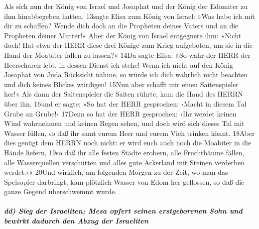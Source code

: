 Als sich nun der König von Israel und Josaphat und der König der
Edomiter zu ihm hinabbegeben hatten, 13sagte Elisa zum König von Israel:
»Was habe ich mit dir zu schaffen? Wende dich doch an die Propheten
deines Vaters und an die Propheten deiner Mutter!« Aber der König von
Israel entgegnete ihm: »Nicht doch! Hat etwa der HERR diese drei Könige
zum Krieg aufgeboten, um sie in die Hand der Moabiter fallen zu lassen?«
14Da sagte Elisa: »So wahr der HERR der Heerscharen lebt, in dessen
Dienst ich stehe! Wenn ich nicht auf den König Josaphat von Juda
Rücksicht nähme, so würde ich dich wahrlich nicht beachten und dich
keines Blickes würdigen! 15Nun aber schafft mir einen Saitenspieler
her!« Als dann der Saitenspieler die Saiten rührte, kam die Hand des
HERRN über ihn, 16und er sagte: »So hat der HERR gesprochen: ›Macht in
diesem Tal Grube an Grube!‹ 17Denn so hat der HERR gesprochen: ›Ihr
werdet keinen Wind wahrnehmen und keinen Regen sehen, und doch wird sich
dieses Tal mit Wasser füllen, so daß ihr samt eurem Heer und eurem Vieh
trinken könnt. 18Aber dies genügt dem HERRN noch nicht: er wird euch
auch noch die Moabiter in die Hände liefern, 19so daß ihr alle festen
Städte erobern, alle Fruchtbäume fällen, alle Wasserquellen verschütten
und alles gute Ackerland mit Steinen verderben werdet.‹« 20Und wirklich,
am folgenden Morgen zu der Zeit, wo man das Speisopfer darbringt, kam
plötzlich Wasser von Edom her geflossen, so daß die ganze Gegend
überschwemmt wurde.

\hypertarget{dd-sieg-der-israeliten-mesa-opfert-seinen-erstgeborenen-sohn-und-bewirkt-dadurch-den-abzug-der-israeliten}{%
\subparagraph{dd) Sieg der Israeliten; Mesa opfert seinen erstgeborenen
Sohn und bewirkt dadurch den Abzug der
Israeliten}\label{dd-sieg-der-israeliten-mesa-opfert-seinen-erstgeborenen-sohn-und-bewirkt-dadurch-den-abzug-der-israeliten}}

